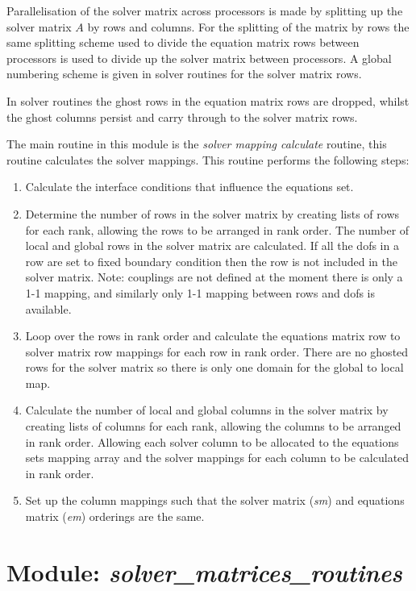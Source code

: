 Parallelisation of the solver matrix across processors is made by splitting up
the solver matrix $A$ by rows and columns. For the splitting of the matrix by
rows the same splitting scheme used to divide the equation matrix rows between
processors is used to divide up the solver matrix between processors. A global
numbering scheme is given in solver routines for the solver matrix rows.

In solver routines the ghost rows in the equation matrix rows are dropped, 
whilst the ghost columns persist and carry through to the solver matrix rows.

The main routine in this module is the \emph{solver mapping calculate} routine,
this routine calculates the solver mappings. This routine performs the 
following steps:

\begin{enumerate}
 \item Calculate the interface conditions that influence the equations set.
 \item Determine the number of rows in the solver matrix by creating lists of 
rows for each rank, allowing the rows to be arranged in rank order. The number 
of local and global rows in the solver matrix are calculated. If all the dofs 
in a row are set to fixed boundary condition then the row is not included in 
the solver matrix. Note: couplings are not defined at the moment there is only 
a 1-1 mapping, and similarly only 1-1 mapping between rows and dofs is 
available. 
 \item Loop over the rows in rank order and calculate the equations matrix row
to solver matrix row mappings for each row in rank order. There are no ghosted 
rows for the solver matrix so there is only one domain for the global to local 
map. 
 \item Calculate the number of local and global columns in the solver matrix by 
creating lists of columns for each rank, allowing the columns to be arranged in 
rank order. Allowing each solver column to be allocated to the equations sets 
mapping array and the solver mappings for each column to be calculated in rank 
order.
 \item Set up the column mappings such that the solver matrix (\emph{sm}) and 
equations matrix (\emph{em}) orderings are the same.
\end{enumerate}


\section{Module: \emph{solver\_matrices\_routines}}
\label{sec:solvermatricesroutines}

